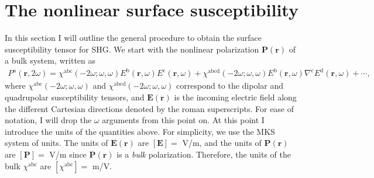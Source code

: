 
\section{The nonlinear surface susceptibility}

In this section I will outline the general procedure to obtain the surface
susceptibility tensor for SHG. We start with the nonlinear polarization
$\mathbf{P}(\mathbf{r})$ of a bulk system, written as
\begin{equation}\label{mshg}
\begin{split}
P^{\mathrm{a}}(\mathbf{r},2\omega)
= \chi^{\mathrm{abc}}(-2\omega;\omega,\omega)
  E^{\mathrm{b}}(\mathbf{r},\omega)E^{\mathrm{c}}(\mathbf{r},\omega)
+ \chi^{\mathrm{abcd}}(-2\omega;\omega,\omega)
  E^{\mathrm{b}}(\mathbf{r},\omega)\nabla^{\mathrm{c}}
  E^{\mathrm{d}}(\mathbf{r},\omega)
+ \cdots,
\end{split}
\end{equation}
where $\chi^{\mathrm{abc}}(-2\omega;\omega,\omega)$ and
$\chi^{\mathrm{abcd}}(-2\omega;\omega,\omega)$ correspond to the dipolar and
quadrupolar susceptibility tensors, and $\mathbf{E}(\mathbf{r})$ is the incoming
electric field along the different Cartesian directions denoted by the roman
superscripts. For ease of notation, I will drop the $\omega$ arguments from this
point on.
At this point I introduce the units of the quantities above. For simplicity, we
use the MKS system of units. The units of $\mathbf{E}(\mathbf{r})$ are
$[\mathbf{E}] = $ V/m, and the units of $\mathbf{P}(\mathbf{r})$ are
$[\mathbf{P}] = $ V/m since $\mathbf{P}(\mathbf{r})$ is a \emph{bulk}
polarization. Therefore, the units of the bulk $\chi^{\mathrm{abc}}$ are
$[\chi^{\mathrm{abc}}] = $ m/V.


